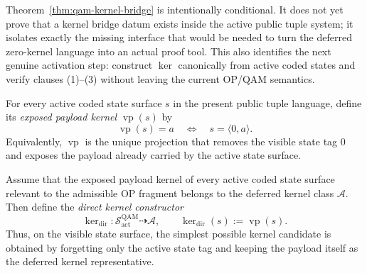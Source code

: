 \begin{remark}\label{rem:qam-kernel-bridge-open}
Theorem~\ref{thm:qam-kernel-bridge} is intentionally conditional. It does not yet prove that a kernel bridge datum exists inside the active public tuple system; it isolates exactly the missing interface that would be needed to turn the deferred zero-kernel language into an actual proof tool. This also identifies the next genuine activation step: construct $\operatorname{ker}$ canonically from active coded states and verify clauses (1)--(3) without leaving the current OP/QAM semantics.
\end{remark}


\begin{definition}\label{def:qam-visible-payload}
For every active coded state surface $s$ in the present public tuple language, define its \emph{exposed payload kernel} $\operatorname{vp}(s)$ by
\[
\operatorname{vp}(s)=a \quad\Longleftrightarrow\quad s=\langle 0,a\rangle.
\]
Equivalently, $\operatorname{vp}$ is the unique projection that removes the visible state tag $0$ and exposes the payload already carried by the active state surface.
\end{definition}

\begin{definition}\label{def:qam-direct-kernel-constructor}
Assume that the exposed payload kernel of every active coded state surface relevant to the admissible OP fragment belongs to the deferred kernel class $\mathcal A$. Then define the \emph{direct kernel constructor}
\[
\operatorname{ker}_{\mathrm{dir}} : \mathcal S^{\mathrm{QAM}}_{\mathrm{act}} \dashrightarrow \mathcal A,
\qquad
\operatorname{ker}_{\mathrm{dir}}(s):=\operatorname{vp}(s).
\]
Thus, on the visible state surface, the simplest possible kernel candidate is obtained by forgetting only the active state tag and keeping the payload itself as the deferred kernel representative.
\end{definition}

